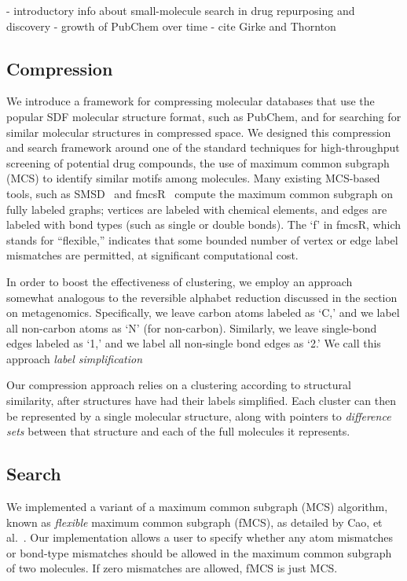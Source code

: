 \documentclass{amsbook}
\theoremstyle{definition}
\theoremstyle{remark}
\numberwithin{equation}{section}
\begin{document}
- introductory info about small-molecule search in drug repurposing and discovery
- growth of PubChem over time
- cite Girke and Thornton

\subsection*{Compression}

We introduce a framework for compressing molecular databases that use the 
popular SDF molecular structure format, such as PubChem, and for searching for 
similar molecular structures in compressed space.
We designed this compression and search framework around one of the standard 
techniques for high-throughput screening of potential drug compounds, the use 
of maximum common subgraph (MCS) to identify similar motifs among molecules.
Many existing MCS-based tools, such as SMSD~\cite{thornton} and 
fmcsR~\cite{girke} compute the maximum common subgraph on fully labeled graphs; 
vertices are labeled with chemical elements, and edges are labeled with bond 
types (such as single or double bonds).
The `f' in fmcsR, which stands for ``flexible,'' indicates that some bounded 
number of vertex or edge label mismatches are permitted, at significant 
computational cost.

In order to boost the effectiveness of clustering, we employ an approach
somewhat analogous to the reversible alphabet reduction discussed in the section
on metagenomics.
Specifically, we leave carbon atoms labeled as `C,' and we label all non-carbon
atoms as `N' (for non-carbon).
Similarly, we leave single-bond edges labeled as `1,' and we label all 
non-single bond edges as `2.'
We call this approach \emph{label simplification}

Our compression approach relies on a clustering according to structural 
similarity, after structures have had their labels simplified.
Each cluster can then be represented by a single molecular structure, along 
with pointers to \emph{difference sets} between that structure and each of the 
full molecules it represents.



\subsection*{Search}

We implemented a variant of a maximum common subgraph (MCS) algorithm, known as \emph{flexible} maximum
common subgraph (fMCS), as detailed by Cao, et al.~\cite{cao}.
Our implementation allows a user to specify whether any atom mismatches or bond-type mismatches should be 
allowed in the maximum common subgraph of two molecules.
If zero mismatches are allowed, fMCS is just MCS.
\end{document}

